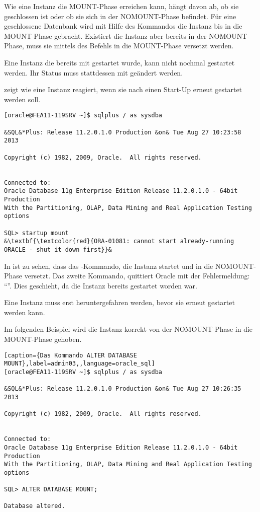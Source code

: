         Wie eine Instanz die MOUNT-Phase erreichen kann, h\"angt davon ab, ob sie geschlossen ist oder ob sie sich in der NOMOUNT-Phase befindet. F\"ur eine geschlossene Datenbank wird mit Hilfe des Kommandos  die Instanz bis in die MOUNT-Phase gebracht. Existiert die Instanz aber bereits in der NOMOUNT-Phase, muss sie mittels des Befehls  in die MOUNT-Phase versetzt werden.
        \begin{merke}
          Eine Instanz die bereits mit  gestartet wurde, kann nicht nochmal gestartet werden. Ihr Status muss stattdessen mit  ge\"andert werden.
        \end{merke}
         zeigt wie eine Instanz reagiert, wenn sie nach einen Start-Up erneut gestartet werden soll.
\clearpage
        \begin{lstlisting}[caption={ORACLE l\"auft noch. Erst
        stoppen.},label=admin02,language=sqlplus]
[oracle@FEA11-119SRV ~]$ sqlplus / as sysdba

&SQL&*Plus: Release 11.2.0.1.0 Production &on& Tue Aug 27 10:23:58 2013

Copyright (c) 1982, 2009, Oracle.  All rights reserved.


Connected to:
Oracle Database 11g Enterprise Edition Release 11.2.0.1.0 - 64bit Production
With the Partitioning, OLAP, Data Mining and Real Application Testing options

SQL> startup mount
&\textbf{\textcolor{red}{ORA-01081: cannot start already-running ORACLE - shut it down first}}&
        \end{lstlisting}
        In  ist zu sehen, dass das -Kommando, die Instanz startet und in die NOMOUNT-Phase versetzt. Das zweite Kommando,  quittiert Oracle mit der Fehlermeldung: \enquote{}. Dies geschieht, da die Instanz bereits gestartet worden war.
        \begin{merke}
          Eine Instanz muss erst heruntergefahren werden, bevor sie erneut gestartet werden kann.
        \end{merke}
        Im folgenden Beispiel wird die Instanz korrekt von der NOMOUNT-Phase in die MOUNT-Phase gehoben.
        \begin{lstlisting}[caption={Das Kommando ALTER DATABASE MOUNT},label=admin03,,language=oracle_sql]
[oracle@FEA11-119SRV ~]$ sqlplus / as sysdba

&SQL&*Plus: Release 11.2.0.1.0 Production &on& Tue Aug 27 10:26:35 2013

Copyright (c) 1982, 2009, Oracle.  All rights reserved.


Connected to:
Oracle Database 11g Enterprise Edition Release 11.2.0.1.0 - 64bit Production
With the Partitioning, OLAP, Data Mining and Real Application Testing options

SQL> ALTER DATABASE MOUNT;

Database altered.
        \end{lstlisting}
